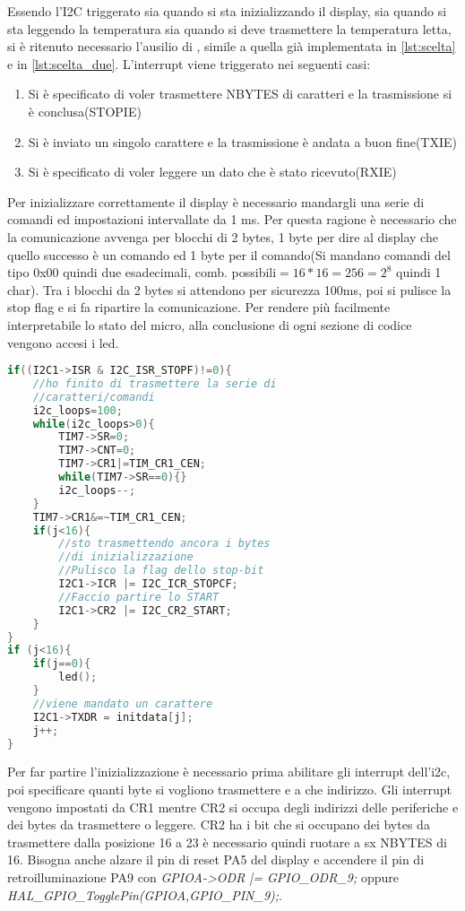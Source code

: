 \documentclass[main.tex]{subfiles}
\begin{document}
Essendo l'I2C triggerato sia quando si sta inizializzando il display, sia quando si sta leggendo la temperatura sia quando si deve trasmettere la temperatura letta, si è ritenuto necessario l'ausilio di , simile a quella già implementata in \ref{lst:scelta} e in \ref{lst:scelta_due}.
L'interrupt viene triggerato nei seguenti casi:\begin{enumerate}
    \item Si è specificato di voler trasmettere NBYTES di caratteri e la trasmissione si è conclusa(STOPIE)
    \item Si è inviato un singolo carattere e la trasmissione è andata a buon fine(TXIE)
    \item Si è specificato di voler leggere un dato che è stato ricevuto(RXIE)
\end{enumerate}
Per inizializzare correttamente il display è necessario mandargli una serie di comandi ed impostazioni intervallate da 1 ms. Per questa ragione è necessario che la comunicazione avvenga per blocchi di 2 bytes, 1 byte per dire al display che quello successo è un comando ed 1 byte per il comando(Si mandano comandi del tipo 0x00 quindi due esadecimali, comb. possibili$=16*16=256=2^8$ quindi 1 char). Tra i blocchi da 2 bytes si attendono per sicurezza 100ms, poi si pulisce la stop flag e si fa ripartire la comunicazione. 
Per rendere più facilmente interpretabile lo stato del micro, alla conclusione di ogni sezione di codice vengono accesi i led.
\begin{lstlisting}[language=C, caption=Gestione Interrupt I2C per inizializzazione Display]
if((I2C1->ISR & I2C_ISR_STOPF)!=0){
    //ho finito di trasmettere la serie di 
    //caratteri/comandi
	i2c_loops=100;
	while(i2c_loops>0){
		TIM7->SR=0;
		TIM7->CNT=0;
		TIM7->CR1|=TIM_CR1_CEN;
		while(TIM7->SR==0){}
		i2c_loops--;
	}
	TIM7->CR1&=~TIM_CR1_CEN;
	if(j<16){
	    //sto trasmettendo ancora i bytes 
	    //di inizializzazione
	    //Pulisco la flag dello stop-bit
		I2C1->ICR |= I2C_ICR_STOPCF;
		//Faccio partire lo START
		I2C1->CR2 |= I2C_CR2_START; 
	}
}
if (j<16){
	if(j==0){
		led();
	}
	//viene mandato un carattere
	I2C1->TXDR = initdata[j];
	j++; 
}
\end{lstlisting}
Per far partire l'inizializzazione è necessario prima abilitare gli interrupt dell'i2c, poi specificare quanti byte si vogliono trasmettere e a che indirizzo. 
Gli interrupt vengono impostati da CR1 mentre CR2 si occupa degli indirizzi delle periferiche e dei bytes da trasmettere o leggere. CR2 ha i bit che si occupano dei bytes da trasmettere dalla posizione 16 a 23 è necessario quindi ruotare a sx NBYTES di 16. Bisogna anche alzare il pin di reset PA5 del display e accendere il pin di retroilluminazione PA9 con \textit{GPIOA->ODR |= GPIO\_ODR\_9;} oppure \textit{HAL\_GPIO\_TogglePin(GPIOA,GPIO\_PIN\_9);}.
\end{document}
